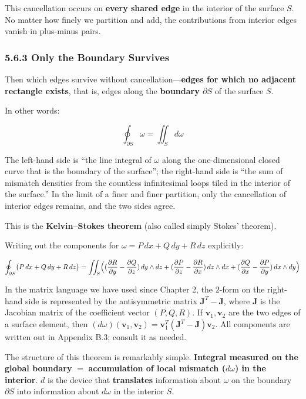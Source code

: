 This cancellation occurs on \textbf{every shared edge} in the interior
of the surface \(S\). No matter how finely we partition and add, the
contributions from interior edges vanish in plus-minus pairs.

\hypertarget{only-the-boundary-survives}{%
\subsubsection{5.6.3 Only the Boundary
Survives}\label{only-the-boundary-survives}}

Then which edges survive without
cancellation---\textbf{edges for which no adjacent rectangle exists},
that is, edges along the \textbf{boundary $\partial S$} of the surface
\(S\).

In other words:

\[\oint_{\partial S} \omega = \iint_S d\omega\]

The left-hand side is ``the line integral of \(\omega\) along the
one-dimensional closed curve that is the boundary of the surface''; the
right-hand side is ``the sum of mismatch densities from the countless
infinitesimal loops tiled in the interior of the surface.'' In the limit
of a finer and finer partition, only the cancellation of interior edges
remains, and the two sides agree.

This is the \textbf{Kelvin–Stokes theorem} (also called simply Stokes'
theorem).

Writing out the components for \(\omega = P\,dx + Q\,dy + R\,dz\)
explicitly:

\[\oint_{\partial S} \bigl(P\,dx + Q\,dy + R\,dz\bigr) = \iint_S \Bigl( (\frac{\partial R}{\partial y} - \frac{\partial Q}{\partial z})\,dy \wedge dz + (\frac{\partial P}{\partial z} - \frac{\partial R}{\partial x})\,dz \wedge dx + (\frac{\partial Q}{\partial x} - \frac{\partial P}{\partial y})\,dx \wedge dy \Bigr)\]

In the matrix language we have used since Chapter 2, the \(2\)-form on
the right-hand side is represented by the antisymmetric matrix
\(\mathbf{J}^T - \mathbf{J}\), where \(\mathbf{J}\) is the Jacobian
matrix of the coefficient vector \((P,Q,R)\). If
\(\mathbf{v}_1, \mathbf{v}_2\) are the two edges of a surface element,
then
\((d\omega)(\mathbf{v}_1, \mathbf{v}_2) = \mathbf{v}_1^T(\mathbf{J}^T - \mathbf{J})\mathbf{v}_2\).
All components are written out in Appendix B.3; consult it as needed.

The structure of this theorem is remarkably simple.
\textbf{Integral measured on the global boundary} \(=\)
\textbf{accumulation of local mismatch ($d\omega$) in the interior}.
\(d\) is the device that \textbf{translates} information about
\(\omega\) on the boundary \(\partial S\) into information about
\(d\omega\) in the interior \(S\).

